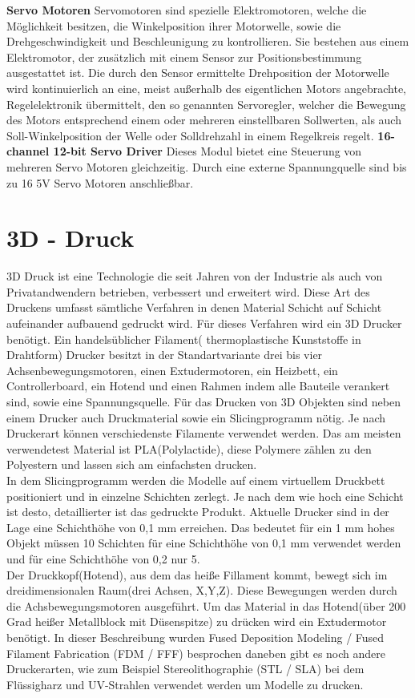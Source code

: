 \documentclass[12pt,					%
							 oneside,			%
							 a4paper,			%
							 halfparskip,		%
							 liststotoc,			%
							 bibtotoc,			%
							 fleqn,				%
							 pointlessnumbers]	%
							 {scrreprt}
\begin{document}
\textbf{Servo Motoren}\newline
	Servomotoren sind spezielle Elektromotoren, welche die Möglichkeit besitzen, die Winkelposition ihrer Motorwelle, sowie die Drehgeschwindigkeit und Beschleunigung zu kontrollieren. Sie bestehen aus einem Elektromotor, der zusätzlich mit einem Sensor zur Positionsbestimmung ausgestattet ist.  Die durch den Sensor ermittelte Drehposition der Motorwelle wird kontinuierlich an eine, meist außerhalb des eigentlichen Motors angebrachte, Regelelektronik übermittelt, den so genannten Servoregler, welcher die Bewegung des Motors entsprechend einem oder mehreren einstellbaren Sollwerten, als auch Soll-Winkelposition der Welle oder Solldrehzahl in einem Regelkreis regelt.	
	\newline\newline	
\textbf{16-channel 12-bit Servo Driver}\newline
	Dieses Modul bietet eine Steuerung von mehreren Servo Motoren gleichzeitig. Durch eine externe Spannungquelle sind bis zu 16 5V Servo Motoren anschließbar.

\section{3D - Druck}
3D Druck ist eine Technologie die seit Jahren von der Industrie als auch von Privatandwendern betrieben, verbessert und erweitert wird. Diese Art des Druckens umfasst sämtliche Verfahren in denen Material Schicht auf Schicht aufeinander aufbauend gedruckt wird.
Für dieses Verfahren wird ein 3D Drucker benötigt. Ein handelsüblicher Filament( thermoplastische Kunststoffe in Drahtform) Drucker besitzt in der Standartvariante drei bis vier Achsenbewegungsmotoren, einen Extudermotoren, ein Heizbett, ein Controllerboard, ein Hotend und einen Rahmen indem alle Bauteile verankert sind, sowie eine Spannungsquelle.
Für das Drucken von 3D Objekten sind neben einem Drucker auch Druckmaterial sowie ein Slicingprogramm nötig. Je nach Druckerart können verschiedenste Filamente verwendet werden. Das am meisten verwendetest Material ist PLA(Polylactide), diese Polymere zählen zu den Polyestern und lassen sich am einfachsten drucken. \\
In dem Slicingprogramm werden die Modelle auf einem virtuellem Druckbett positioniert und in einzelne Schichten zerlegt. Je nach dem wie hoch eine Schicht ist desto, detaillierter ist das gedruckte Produkt. Aktuelle Drucker sind in der Lage eine Schichthöhe von 0,1 mm erreichen. Das bedeutet für ein 1 mm hohes Objekt müssen 10 Schichten für eine Schichthöhe von 0,1 mm verwendet werden und für eine Schichthöhe von 0,2 nur 5. \\
Der Druckkopf(Hotend), aus dem das heiße Fillament kommt, bewegt sich im dreidimensionalen Raum(drei Achsen, X,Y,Z). Diese Bewegungen werden durch die Achsbewegungsmotoren ausgeführt. Um das Material in das Hotend(über 200 Grad heißer Metallblock mit Düsenspitze) zu drücken wird ein Extudermotor benötigt.
In dieser Beschreibung wurden Fused Deposition Modeling / Fused Filament Fabrication (FDM / FFF) besprochen daneben gibt es noch andere Druckerarten, wie zum Beispiel Stereolithographie (STL / SLA) bei dem Flüssigharz und UV-Strahlen verwendet werden um Modelle zu drucken.
\end{document}
